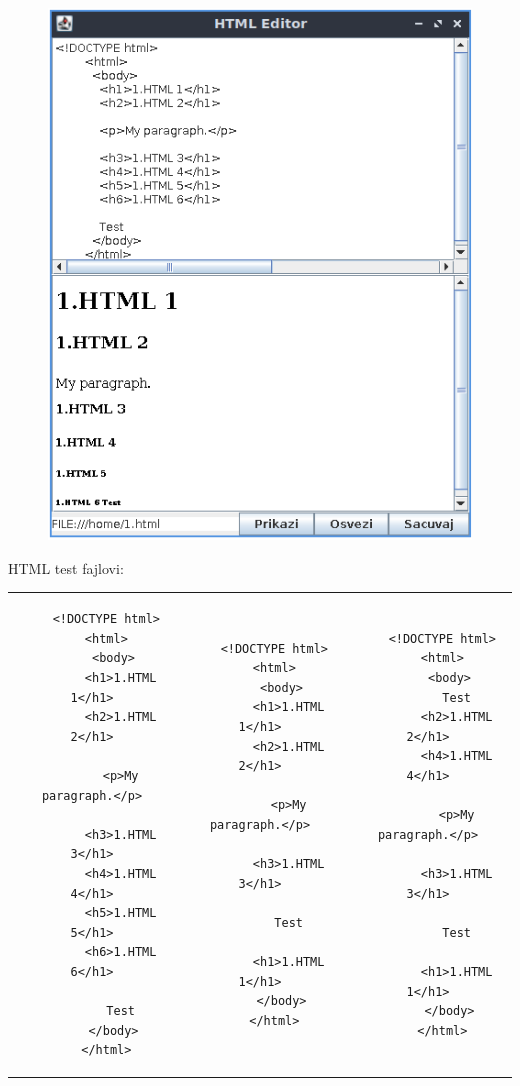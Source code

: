\documentclass[]{article}
\begin{document}
\begin{figure}[H]
  \centering
  \includegraphics[scale=0.6]{fig.PNG}
  \label{fig2}
\end{figure}


HTML test fajlovi:\\

\noindent
\begin{tabular}{c|c|c}
\begin{lstlisting}
    <!DOCTYPE html>
    <html>
      <body>
        <h1>1.HTML 1</h1>
        <h2>1.HTML 2</h1>
        
        <p>My paragraph.</p>

        <h3>1.HTML 3</h1>
        <h4>1.HTML 4</h1>
        <h5>1.HTML 5</h1>
        <h6>1.HTML 6</h1>

        Test
      </body>
    </html>
\end{lstlisting}&
\begin{lstlisting}
    <!DOCTYPE html>
    <html>
      <body>
        <h1>1.HTML 1</h1>
        <h2>1.HTML 2</h1>
        
        <p>My paragraph.</p>

        <h3>1.HTML 3</h1>

        Test

        <h1>1.HTML 1</h1>
      </body>
    </html>
\end{lstlisting}&
\begin{lstlisting}
    <!DOCTYPE html>
    <html>
      <body>
        Test
        <h2>1.HTML 2</h1>
        <h4>1.HTML 4</h1>
        
        <p>My paragraph.</p>

        <h3>1.HTML 3</h1>

        Test

        <h1>1.HTML 1</h1>
      </body>
    </html>
\end{lstlisting}
\end{tabular} 
\end{document}
